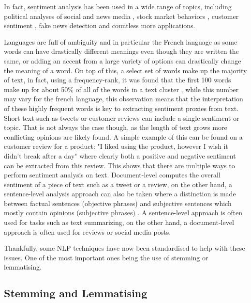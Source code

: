 In fact, sentiment analysis has been used in a wide range of topics, including political analyses of social and news media \citep{ahmad2011new}, stock market behaviors \citep{rao2012analyzing,li2014news}, customer sentiment \citep{cambria2013new,mouthami2013sentiment}, fake news detection \citep{bhutani2019fake} and countless more applications.

Languages are full of ambiguity and in particular the French language as some words can have drastically different meanings even though they are written the same, or adding an accent from a large variety of options can drastically change the meaning of a word. On top of this, a select set of words make up the majority of text, in fact, using a frequency-rank, it was found that the first 100 words make up for about 50\% of all of the words in a text cluster \citep{ahmad2007being}, while this number may vary for the french language, this observation means that the interpretation of these highly frequent words is key to extracting sentiment proxies from text. Short text such as tweets \citep{chandrasekaran2020topics} or customer reviews can include a single sentiment or topic. That is not always the case though, as the length of text grows more conflicting opinions are likely found. A simple example of this can be found on a customer review for a product: "I liked using the product, however I wish it didn't break after a day" where clearly both a positive and negative sentiment can be extracted from this review. This shows that there are multiple ways to perform sentiment analysis on text. Document-level computes the overall sentiment of a piece of text such as a tweet or a review, on the other hand, a sentence-level analysis approach can also be taken where a distinction is made between factual sentences (objective phrases) and subjective sentences which mostly contain opinions (subjective phrases) \citep{wilson2009recognizing}. A sentence-level approach is often used for tasks such as text summarizing, on the other hand, a document-level approach is often used for reviews or social media posts. 

Thankfully, some NLP techniques have now been standardised to help with these issues. One of the most important ones being the use of stemming or lemmatising.

\subsection{Stemming and Lemmatising}
\label{lemmatization}\label{stemming}

